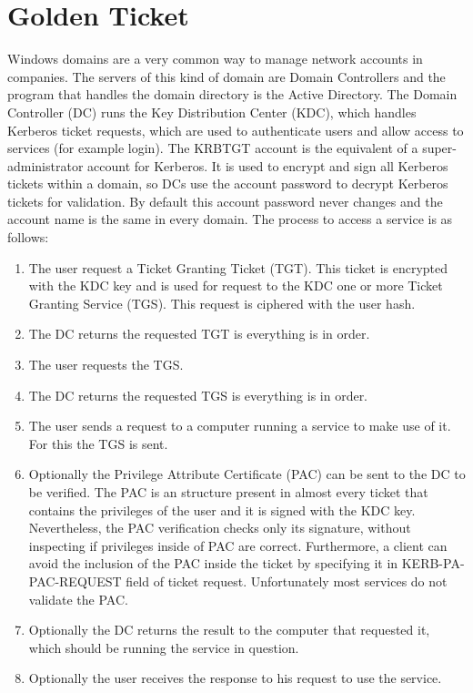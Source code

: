 \newcommand{\RNO}{\cellcolor{red!60}No}
\newcommand{\RYES}{\cellcolor{green!60}Yes}

\section{Golden Ticket}
Windows domains are a very common way to manage network accounts in companies. The servers of this kind of domain are Domain Controllers and the program that handles the domain directory is the Active Directory. The Domain Controller (DC) runs the Key Distribution Center (KDC), which handles Kerberos ticket requests, which are used to authenticate users and allow access to services (for example login).
\linej
The KRBTGT account is the equivalent of a super-administrator account for Kerberos. It is used to encrypt and sign all Kerberos tickets within a domain, so DCs use the account password to decrypt Kerberos tickets for validation.
By default this account password never changes and the account name is the same in every domain\cite{stealthbits}.
\linej
\linej
The process to access a service is as follows\cite{tarlogic_theory}\cite{tarlogic_comprehension}\cite{events_1}:
\begin{enumerate}
	\item The user request a Ticket Granting Ticket (TGT). This ticket is encrypted with the KDC key and is used for request to the KDC one or more Ticket Granting Service (TGS). This request is ciphered with the user hash.
	\item The DC returns the requested TGT is everything is in order.
	\item The user requests the TGS.
	\item The DC returns the requested TGS is everything is in order.
	\item The user sends a request to a computer running a service to make use of it. For this the TGS is sent.
	\item Optionally the Privilege Attribute Certificate (PAC) can be sent to the DC to be verified. The PAC is an structure present in almost every ticket that contains the privileges of the user and it is signed with the KDC key. Nevertheless, the PAC verification checks only its signature, without inspecting if privileges inside of PAC are correct. Furthermore, a client can avoid the inclusion of the PAC inside the ticket by specifying it in KERB-PA-PAC-REQUEST field of ticket request. Unfortunately most services do not validate the PAC.
	\item Optionally the DC returns the result to the computer that requested it, which should be running the service in question.
	\item Optionally the user receives the response to his request to use the service.
\end{enumerate}

